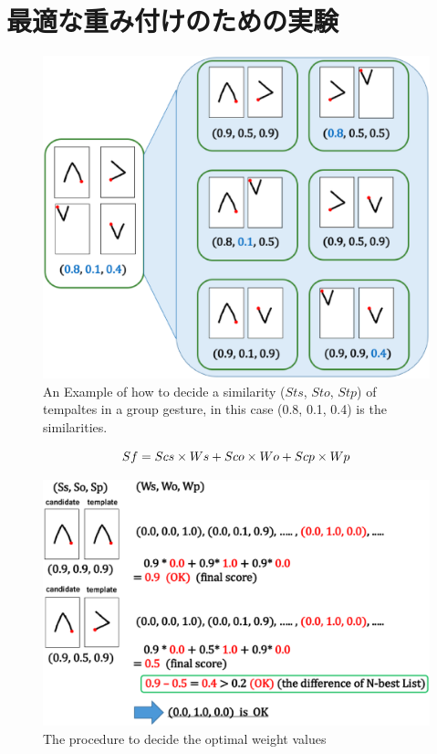 \section{最適な重み付けのための実験}
\begin{figure} [h!]
	\begin{center}
		\includegraphics [width=0.8\hsize ]{img/group_similarity.eps}
	\end{center}
	\caption{An Example of how to decide a similarity ($Sts$, $Sto$, $Stp$) of tempaltes in a group gesture, in this case (0.8, 0.1, 0.4) is the similarities.}
	\label{fig:group_similarity}
\end{figure}

\begin{equation}
S{\tiny f} = S{\scriptsize cs} \times W{\scriptsize s} + S{\scriptsize co} \times W{\scriptsize o} + S{\scriptsize cp} \times W{\scriptsize p}
\end{equation}

\begin{figure} [h!]
	\begin{center}
		\includegraphics [width=0.8\hsize ]{img/weight_method1.eps}
	\end{center}
	\caption{The procedure to decide the optimal weight values }
	\label{fig:weight_method1}
\end{figure}

